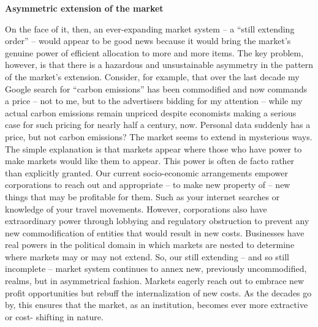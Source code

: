 \documentclass[
]{book}
\begin{document}
\textbf{Asymmetric extension of the market}

On the face of it, then, an ever-expanding market system -- a ``still extending order'' -- would
appear to be good news because it would bring the market's genuine power of efficient
allocation to more and more items. The key problem, however, is that there is a hazardous
and unsustainable asymmetry in the pattern of the market's extension.
Consider, for example, that over the last decade my Google search for ``carbon emissions''
has been commodified and now commands a price -- not to me, but to the advertisers bidding
for my attention -- while my actual carbon emissions remain unpriced despite economists
making a serious case for such pricing for nearly half a century, now. Personal data suddenly
has a price, but not carbon emissions? The market seems to extend in mysterious ways.
The simple explanation is that markets appear where those who have power to make markets
would like them to appear.
This power is often de facto rather than explicitly granted. Our current socio-economic
arrangements empower corporations to reach out and appropriate -- to make new property of
-- new things that may be profitable for them. Such as your internet searches or knowledge of
your travel movements. However, corporations also have extraordinary power through
lobbying and regulatory obstruction to prevent any new commodification of entities that would
result in new costs. Businesses have real powers in the political domain in which markets are
nested to determine where markets may or may not extend.
So, our still extending -- and so still incomplete -- market system continues to annex new,
previously uncommodified, realms, but in asymmetrical fashion. Markets eagerly reach out to
embrace new profit opportunities but rebuff the internalization of new costs. As the decades
go by, this ensures that the market, as an institution, becomes ever more extractive or cost-
shifting in nature.
\end{document}

